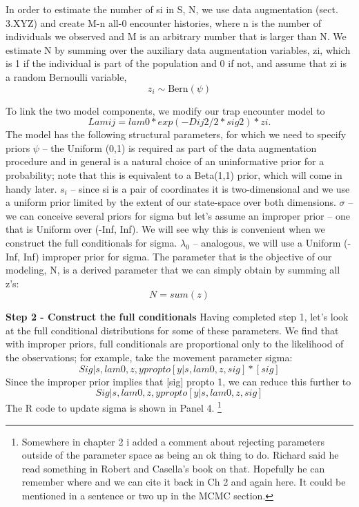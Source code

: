 In order to estimate the number of si in S, N, we use data augmentation (sect. 3.XYZ) and create M-n all-0 encounter histories, where n is the number of individuals we observed and M is an arbitrary number that is larger than N. We estimate N by summing over the auxiliary data augmentation variables, zi, which is 1 if the individual is part of the population and 0 if not, and assume that zi is a random Bernoulli variable,
\[
z_{i} \sim \mbox{Bern}(\psi)
\]


To link the two model components, we modify our trap encounter model to
\[
Lamij = lam0 * exp(-Dij2/2*sig2) * zi. 
\]
The model has the following structural parameters, for which we need to specify priors
$\psi$ – the Uniform (0,1) is required as part of the data augmentation procedure and in general is a natural choice of an uninformative prior for a probability; note that this is equivalent to a Beta(1,1) prior, which will come in handy later.
$s_{i}$ – since si is a pair of coordinates it is two-dimensional and we use a uniform prior limited by the extent of our state-space over both dimensions. 
$\sigma$ – we can conceive several priors for sigma but let's assume an improper prior – one that is Uniform over (-Inf, Inf). We will see why this is convenient when we construct the full conditionals for sigma.
$\lambda_{0}$ – analogous, we will use a Uniform (-Inf, Inf) improper prior for sigma.
The parameter that is the objective of our modeling, N, is a derived parameter that we can simply obtain by summing all z's:
\[
N=sum(z)
\]


{\bf Step 2 - Construct the full conditionals}
Having completed step 1, let's look at the full conditional distributions for some of these parameters.
We find that with improper priors, full conditionals are proportional only to the likelihood of the observations; for example, take the movement parameter sigma:
\[
Sig|s, lam0, z, y propto [y| s, lam0, z, sig] * [sig]
\]
Since the improper prior implies that [sig] propto 1, we can reduce this further to 
\[
Sig|s, lam0, z, y propto [y| s, lam0, z, sig]
\]
The R code to update sigma is shown in Panel 4. \footnote{ Somewhere in chapter 2 i added a comment about rejecting parameters outside of the parameter space as being an ok thing to do. Richard said he read something in Robert and Casella’s book on that. Hopefully he can remember where and we can cite it back in Ch 2 and again here.  It could be mentioned in a sentence or two up in the MCMC section.}

